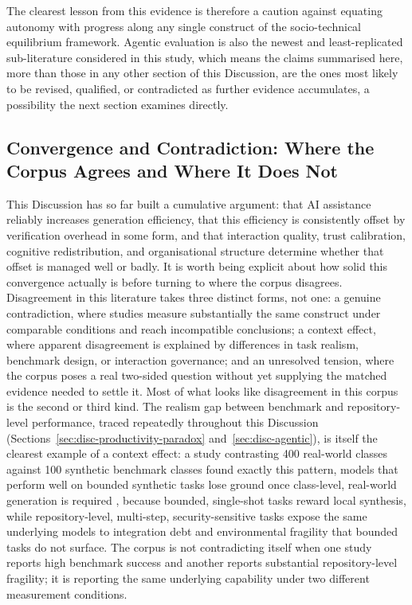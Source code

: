 The clearest lesson from this evidence is therefore a caution against equating autonomy with progress along any single construct of the socio-technical equilibrium framework. Agentic evaluation is also the newest and least-replicated sub-literature considered in this study, which means the claims summarised here, more than those in any other section of this Discussion, are the ones most likely to be revised, qualified, or contradicted as further evidence accumulates, a possibility the next section examines directly.

\subsection{Convergence and Contradiction: Where the Corpus Agrees and Where It Does Not}
\label{sec:disc-convergence}
This Discussion has so far built a cumulative argument: that AI assistance reliably increases generation efficiency, that this efficiency is consistently offset by verification overhead in some form, and that interaction quality, trust calibration, cognitive redistribution, and organisational structure determine whether that offset is managed well or badly. It is worth being explicit about how solid this convergence actually is before turning to where the corpus disagrees. Disagreement in this literature takes three distinct forms, not one: a genuine contradiction, where studies measure substantially the same construct under comparable conditions and reach incompatible conclusions; a context effect, where apparent disagreement is explained by differences in task realism, benchmark design, or interaction governance; and an unresolved tension, where the corpus poses a real two-sided question without yet supplying the matched evidence needed to settle it. Most of what looks like disagreement in this corpus is the second or third kind. The realism gap between benchmark and repository-level performance, traced repeatedly throughout this Discussion (Sections~\ref{sec:disc-productivity-paradox} and~\ref{sec:disc-agentic}), is itself the clearest example of a context effect: a study contrasting 400 real-world classes against 100 synthetic benchmark classes found exactly this pattern, models that perform well on bounded synthetic tasks lose ground once class-level, real-world generation is required \cite{rahman_beyond_2025}, because bounded, single-shot tasks reward local synthesis, while repository-level, multi-step, security-sensitive tasks expose the same underlying models to integration debt and environmental fragility that bounded tasks do not surface. The corpus is not contradicting itself when one study reports high benchmark success and another reports substantial repository-level fragility; it is reporting the same underlying capability under two different measurement conditions.

